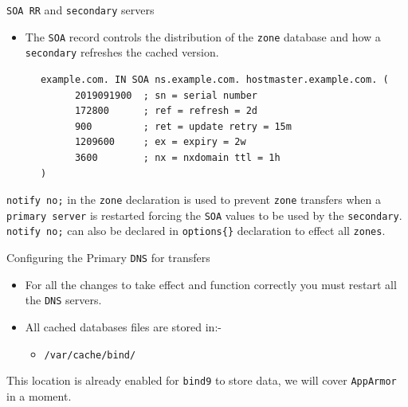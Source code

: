 \documentclass[xcolor=table,aspectratio=169]{beamer}
\begin{document}
\begin{frame}[fragile]{\texttt{SOA RR} and \texttt{secondary} servers}
  \begin{itemize}
    \item The \texttt{SOA} record controls the distribution of the \texttt{zone} database and how a \texttt{secondary} refreshes the cached version.
  \end{itemize}
  \begin{tcolorbox}
    \lstset{
      basicstyle=\tiny\ttfamily,
    }
    \begin{lstlisting}
      example.com. IN SOA ns.example.com. hostmaster.example.com. ( 
	        2019091900  ; sn = serial number 
	        172800      ; ref = refresh = 2d 
	        900         ; ret = update retry = 15m 
	        1209600     ; ex = expiry = 2w 
	        3600        ; nx = nxdomain ttl = 1h 
      ) 
    \end{lstlisting}
  \end{tcolorbox}
  \begin{tcolorbox}[title={\textbf{PERFORMANCE:}}]
    \scriptsize \texttt{notify no;} in the \texttt{zone} declaration is used to prevent \texttt{zone} transfers when a \texttt{primary server} is restarted forcing the \texttt{SOA} values to be used by the \texttt{secondary}.\\
    \scriptsize \texttt{notify no;} can also be declared in \texttt{options\{\}} declaration to effect all \texttt{zones}.    
  \end{tcolorbox}
\end{frame}

\begin{frame}{Configuring the Primary \texttt{DNS} for transfers}
  \begin{itemize}
    \item For all the changes to take effect and function correctly you must restart all the \texttt{DNS} servers.
    \item All cached databases files are stored in:-
      \begin{itemize}
        \item \texttt{/var/cache/bind/}
      \end{itemize}
  \end{itemize}
  \begin{tcolorbox}[title={\textbf{NOTE:}}]
    This location is already enabled for \texttt{bind9} to store data, we will cover \texttt{AppArmor} in a moment.
  \end{tcolorbox}
\end{frame}
\end{document}
